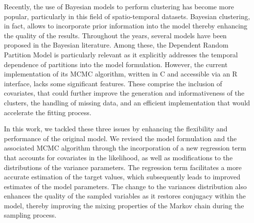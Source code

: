 \documentclass[12pt,	%
	a4paper,		%
	twoside,		%
	openright,		%
	titlepage,%
	]{book}
\theoremstyle{definition}
\let\cite\citep
\begin{document}
Recently, the use of Bayesian models to perform clustering has become more popular, particularly in this field of spatio-temporal datasets. Bayesian clustering, in fact, allows to incorporate prior information into the model thereby enhancing the quality of the results. Throughout the years, several models have been proposed in the Bayesian literature. Among these, the Dependent Random Partition Model \cite{1-drpm} is particularly relevant as it explicitly addresses the temporal dependence of partitions into the model formulation. However, the current implementation of its MCMC algorithm, written in C and accessible via an R interface, lacks some significant features. These comprise the inclusion of covariates, that could further improve the generation and informativeness of the clusters, the handling of missing data, and an efficient implementation that would accelerate the fitting process.



In this work, we tackled these three issues by enhancing the flexibility and performance of the original model. We revised the model formulation and the associated MCMC algorithm through the incorporation of a new regression term that accounts for covariates in the likelihood, as well as modifications to the distributions of the variance parameters. The regression term facilitates a more accurate estimation of the target values, which subsequently leads to improved estimates of the model parameters. The change to the variances distribution also enhances the quality of the sampled variables as it restores conjugacy within the model, thereby improving the mixing properties of the Markov chain during the sampling process.
\end{document}
